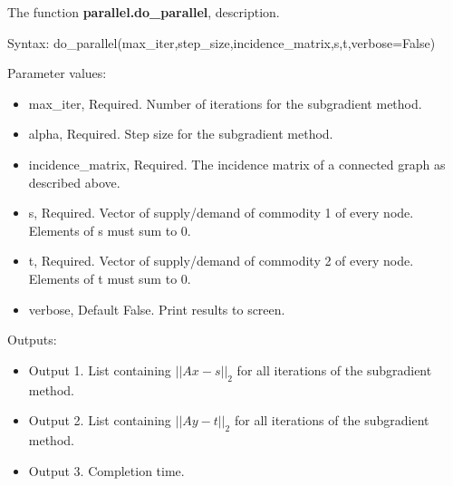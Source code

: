 \documentclass[12pt]{article}
\begin{document}
The function \textbf{parallel.do\_parallel}, description.

Syntax: do\_parallel(max\_iter,step\_size,incidence\_matrix,s,t,verbose=False)

Parameter values:
\begin{itemize}
	\item max\_iter, Required. Number of iterations for the subgradient method.
	\item alpha, Required. Step size for the subgradient method.
	\item incidence\_matrix, Required. The incidence matrix of a connected graph as described above.
	\item s, Required. Vector of supply/demand of commodity 1 of every node. Elements of s must sum to 0.
	\item t, Required. Vector of supply/demand of commodity 2 of every node. Elements of t must sum to 0.
	\item verbose, Default False. Print results to screen.
\end{itemize}

Outputs:
\begin{itemize}
	\item Output 1. List containing $||Ax-s||_2$ for all iterations of the subgradient method.
	\item Output 2. List containing $||Ay-t||_2$ for all iterations of the subgradient method.
	\item Output 3. Completion time.
\end{itemize}
\end{document}
